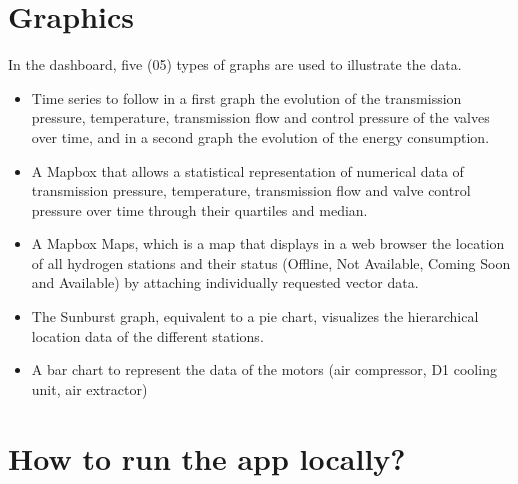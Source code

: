 \documentclass[letterpaper,10pt,english]{sphinxmanual}
\begin{document}
\section{Graphics}
\label{\detokenize{The web application in practice:graphics}}
\sphinxAtStartPar
In the dashboard, five (05) types of graphs are used to illustrate the data.
\begin{itemize}
\item {} 
\sphinxAtStartPar
Time series to follow in a first graph the evolution of the transmission pressure, temperature, transmission flow and control pressure of the valves over time, and in a second graph the evolution of the energy consumption.

\item {} 
\sphinxAtStartPar
A Mapbox that allows a statistical representation of numerical data of transmission pressure, temperature, transmission flow and valve control pressure over time through their quartiles and median.

\item {} 
\sphinxAtStartPar
A Mapbox Maps, which is a map that displays in a web browser the location of all hydrogen stations and their status (Offline, Not Available, Coming Soon and Available) by attaching individually requested vector data.

\item {} 
\sphinxAtStartPar
The Sunburst graph, equivalent to a pie chart, visualizes the hierarchical location data of the different stations.

\item {} 
\sphinxAtStartPar
A bar chart to represent the data of the motors (air compressor, D1 cooling unit, air extractor)

\end{itemize}


\section{How to run the app locally?}
\label{\detokenize{The web application in practice:how-to-run-the-app-locally}}
\sphinxAtStartPar
{}

\sphinxAtStartPar
{}

\begin{DUlineblock}{0em}
\item[] 
\item[] 
\item[] 
\item[] 
\end{DUlineblock}
\end{document}
